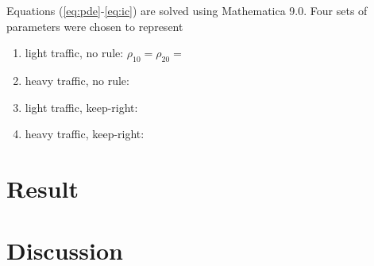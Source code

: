 \documentclass[aps,prl,superscriptaddress,12pt]{revtex4-1}
\begin{document}
	Equations (\ref{eq:pde}-\ref{eq:ic}) are solved using Mathematica 9.0. Four sets of parameters were chosen to represent
	\begin{enumerate}
	\item{light traffic, no rule:}
		$\rho_{10}=\rho_{20}=$
	\item{heavy traffic, no rule:}
	\item{light traffic, keep-right:}
	\item{heavy traffic, keep-right:}
	\end{enumerate}
	
	\pagebreak

	\section{Result}

	\section{Discussion}
	


\end{document}
